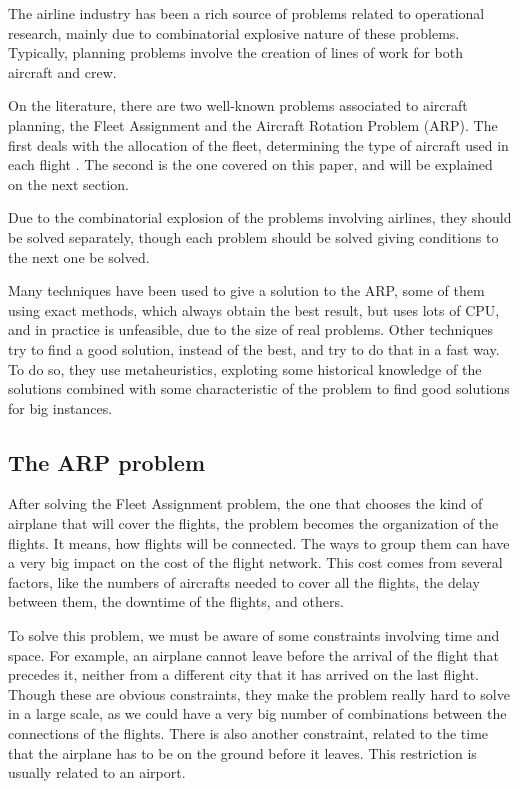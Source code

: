 \documentclass{endm}
\begin{document}
The airline industry has been a rich source of problems related to operational research, mainly due to combinatorial explosive nature of these problems. Typically, planning problems involve the creation of lines of work for both aircraft and crew.

On the literature, there are two well-known problems associated to aircraft planning, the Fleet Assignment and the Aircraft Rotation Problem (ARP). The first deals with the allocation of the fleet, determining the type of aircraft used in each flight \cite{pimentel2005}. The second is the one covered on this paper, and will be explained on the next section.

Due to the combinatorial explosion of the problems involving airlines, they should be solved separately, though each problem should be solved giving conditions to the next one be solved. 

Many techniques have been used to give a solution to the ARP, some of them using exact methods, which always obtain the best result, but uses lots of CPU, and in practice is unfeasible, due to the size of real problems. Other techniques try to find a good solution, instead of the best, and try to do that in a fast way. To do so, they use metaheuristics, exploting some historical knowledge of the solutions combined with some characteristic of the problem to find good solutions for big instances.

\subsection{The ARP problem}

After solving the Fleet Assignment problem, the one that chooses the kind of airplane that will cover the flights, the problem becomes the organization of the flights. It means, how flights will be connected. The ways to group them can have a very big impact on the cost of the flight network. This cost comes from several factors, like the numbers of aircrafts needed to cover all the flights, the delay between them, the downtime of the flights, and others.

To solve this problem, we must be aware of some constraints involving time and space. For example, an airplane cannot leave before the arrival of the flight that precedes it, neither from a different city that it has arrived on the last flight. Though these are obvious constraints, they make the problem really hard to solve in a large scale, as we could have a very big number of combinations between the connections of the flights. There is also another constraint, related to the time that the airplane has to be on the ground before it leaves. This restriction is usually related to an airport.
\end{document}
